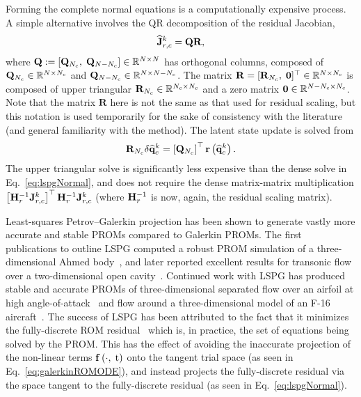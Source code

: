 Forming the complete normal equations is a computationally expensive process. A simple alternative involves the QR decomposition of the residual Jacobian,
%
\begin{equation}
    \mathbf{\widehat{J}}_{r,c}^{k} = \mathbf{QR},
\end{equation}
%
where $\mathbf{Q} := \left[\mathbf{Q}_{N_c}, \; \mathbf{Q}_{N-N_c}\right] \in \mathbb{R}^{N \times N}$ has orthogonal columns, composed of $\mathbf{Q}_{N_c} \in \mathbb{R}^{N \times N_c}$ and $\mathbf{Q}_{N - N_c} \in \mathbb{R}^{N \times N - N_c}$. The matrix $\mathbf{R} = [\mathbf{R}_{N_c}, \; \mathbf{0}]^\top \in \mathbb{R}^{N \times N_c}$ is composed of upper triangular $\mathbf{R}_{N_c} \in \mathbb{R}^{N_c \times N_c}$ and a zero matrix $\mathbf{0} \in \mathbb{R}^{N - N_c \times N_c}$. Note that the matrix $\mathbf{R}$ here is not the same as that used for residual scaling, but this notation is used temporarily for the sake of consistency with the literature (and general familiarity with the method). The latent state update is solved from
%
\begin{equation}
    \mathbf{R}_{N_c} \delta \mathbf{\widehat{q}}_{c}^{k} = \left[\mathbf{Q}_{N_c}\right]^\top \mathbf{r}\left(\mathbf{\widehat{q}}_{c}^{k}\right).
\end{equation}
%
The upper triangular solve is significantly less expensive than the dense solve in Eq.~\ref{eq:lspgNormal}, and does not require the dense matrix-matrix multiplication $\left[\resScaleInv \jacobResCons^{\newtonIdx}\right]^\top \resScaleInv \jacobResCons^{\newtonIdx}$ (where $\resScaleInv$ is now, again, the residual scaling matrix).

Least-squares Petrov--Galerkin projection has been shown to generate vastly more accurate and stable PROMs compared to Galerkin PROMs. The first publications to outline LSPG computed a robust PROM simulation of a three-dimensional Ahmed body~\cite{Carlberg2010,Carlberg2013}, and later reported excellent results for transonic flow over a two-dimensional open cavity~\cite{Carlberg2017}. Continued work with LSPG has produced stable and accurate PROMs of three-dimensional separated flow over an airfoil at high angle-of-attack~\cite{Grimberg2020Hyper} and flow around a three-dimensional model of an F-16 aircraft~\cite{Grimberg2021}. The success of LSPG has been attributed to the fact that it minimizes the fully-discrete ROM residual~\cite{Grimberg2020} which is, in practice, the set of equations being solved by the PROM. This has the effect of avoiding the inaccurate projection of the non-linear terms $\mathbf{f} \left(\cdot, \; \text{t}\right)$ onto the tangent trial space (as seen in Eq.~\ref{eq:galerkinROMODE}), and instead projects the fully-discrete residual via the space tangent to the fully-discrete residual (as seen in Eq.~\ref{eq:lspgNormal}).

